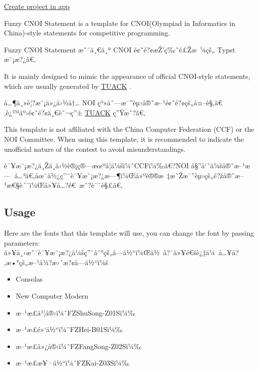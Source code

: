 \href{/app?template=fuzzy-cnoi-statement&version=0.1.2}{Create project
in app}

\label{readme}
Fuzzy CNOI Statement is a template for CNOI(Olympiad in Informatics in
China)-style statements for competitive programming.

Fuzzy CNOI Statement æ˜¯ä¸€ä¸ª CNOI é¢˜é?¢æŽ'ç‰ˆé£Žæ~¼çš„ Typst
æ¨¡æ?¿ã€‚

It is mainly designed to mimic the appearance of official CNOI-style
statements, which are usually generated by
\href{https://gitee.com/mulab/oi_tools}{TUACK} .

å\ldots¶ä¸»è¦?æ¨¡ä»¿å›½å†\ldots{} NOI
ç³»åˆ---æ¯''èµ›å®˜æ--¹é¢˜é?¢çš„å¤--è§‚ã€‚è¿™äº›é¢˜é?¢ä¸€èˆ¬ç''±
\href{https://gitee.com/mulab/oi_tools}{TUACK} ç''Ÿæˆ?ã€‚

This template is not affiliated with the China Computer Federation (CCF)
or the NOI Committee. When using this template, it is recommended to
indicate the unofficial nature of the contest to avoid
misunderstandings.

è¯¥æ¨¡æ?¿ä¸Žä¸­å›½è®¡ç®---æœºå­¦ä¼šï¼ˆCCFï¼‰ã€?NOI
å§''å`˜ä¼šå®˜æ--¹æ---~å\ldots³ã€‚åœ¨ä½¿ç''¨è¯¥æ¨¡æ?¿æ---¶ï¼Œå»ºè®®æ~‡æ˜Žæ¯''èµ›çš„é?žå®˜æ--¹æ€§è´¨ï¼Œä»¥å\ldots?é€~æˆ?è¯¯è§£ã€‚

\subsection{Usage}\label{usage}

Here are the fonts that this template will use, you can change the font
by passing parameters:\\
ä»¥ä¸‹æ˜¯è¯¥æ¨¡æ?¿ä¼šç''¨åˆ°çš„å­---ä½``ï¼Œä½~å?¯ä»¥é€šè¿‡ä¼~å\ldots¥å?‚æ•°çš„æ--¹å¼?æ›´æ?¢å­---ä½``ï¼š

\begin{itemize}
\tightlist
\item
  Consolas
\item
  New Computer Modern
\item
  æ--¹æ­£ä¹¦å®‹ï¼ˆFZShuSong-Z01Sï¼‰
\item
  æ--¹æ­£é»`ä½``ï¼ˆFZHei-B01Sï¼‰
\item
  æ--¹æ­£ä»¿å®‹ï¼ˆFZFangSong-Z02Sï¼‰
\item
  æ--¹æ­£æ¥·ä½``ï¼ˆFZKai-Z03Sï¼‰
\end{itemize}

